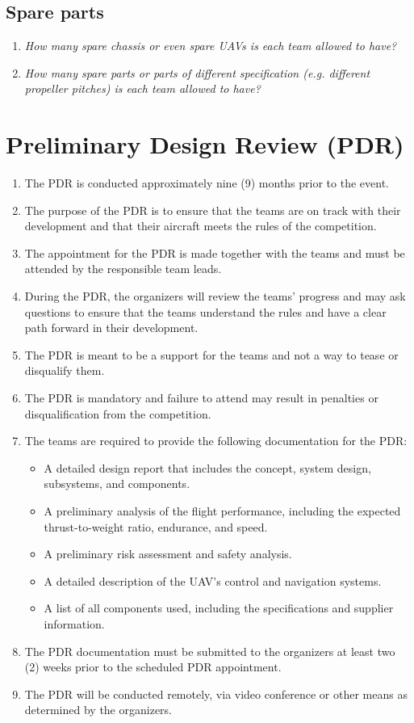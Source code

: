     \subsection{Spare parts}
    \begin{enumerate}
      \item \emph{How many spare chassis or even spare UAVs is each team allowed to have?}
      \item \emph{How many spare parts or parts of different specification (e.g. different propeller pitches) is each team allowed to have?}
    \end{enumerate}

    \section{Preliminary Design Review (PDR)}
    \begin{enumerate}
    \item The PDR is conducted approximately nine (9) months prior to the event.
    \item The purpose of the PDR is to ensure that the teams are on track with their development and that their aircraft meets the rules of the competition.
    \item The appointment for the PDR is made together with the teams and must be attended by the responsible team leads.
    \item During the PDR, the organizers will review the teams' progress and may ask questions to ensure that the teams understand the rules and have a clear path forward in their development.
    \item The PDR is meant to be a support for the teams and not a way to tease or disqualify them.
    \item The PDR is mandatory and failure to attend may result in penalties or disqualification from the competition.
    \item The teams are required to provide the following documentation for the PDR:
    \begin{itemize}
    \item A detailed design report that includes the concept, system design, subsystems, and components.
    \item A preliminary analysis of the flight performance, including the expected thrust-to-weight ratio, endurance, and speed.
    \item A preliminary risk assessment and safety analysis.
    \item A detailed description of the UAV's control and navigation systems.
    \item A list of all components used, including the specifications and supplier information.
    \end{itemize}
    \item The PDR documentation must be submitted to the organizers at least two (2) weeks prior to the scheduled PDR appointment.
    \item The PDR will be conducted remotely, via video conference or other means as determined by the organizers.
    \end{enumerate}


